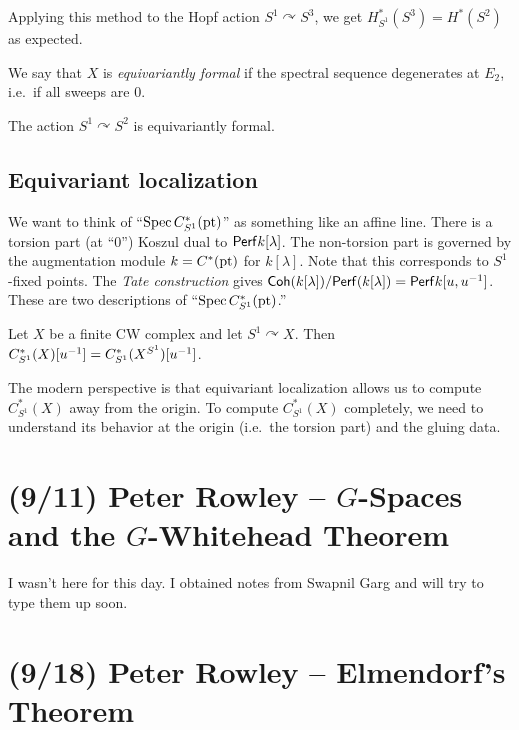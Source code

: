 \documentclass{article}
\begin{document}
\begin{ex}
  Applying this method to the Hopf action $S^1 \curvearrowright S^3$, we get $H^*_{S^1}(S^3) = H^*(S^2)$ as expected.
\end{ex}

We say that $X$ is \emph{equivariantly formal} if the spectral sequence degenerates at $E_2$, i.e.\ if all sweeps are $0$.

\begin{ex}
  The action $S^1 \curvearrowright S^2$ is equivariantly formal.
\end{ex}

\subsection{Equivariant localization}

We want to think of ``$\operatorname{Spec} C^*_{S^1}(\operatorname{pt})$'' as something like an affine line.
There is a torsion part (at ``$0$'') Koszul dual to $\mathsf{Perf} k[\lambda]$.
The non-torsion part is governed by the augmentation module $k = C^*(\operatorname{pt})$ for $k[\lambda]$.
Note that this corresponds to $S^1$-fixed points.
The \emph{Tate construction} gives $\mathsf{Coh}(k[\lambda]) / \mathsf{Perf}(k[\lambda]) = \mathsf{Perf} k[u, u^{-1}]$.
These are two descriptions of ``$\operatorname{Spec} C^*_{S^1}(\operatorname{pt})$.''

\begin{thm}
  Let $X$ be a finite CW complex and let $S^1 \curvearrowright X$.
  Then $C^*_{S^1}(X)[u^{-1}] = C^*_{S^1}(X^{S^1})[u^{-1}]$.
\end{thm}

The modern perspective is that equivariant localization allows us to compute $C^*_{S^1}(X)$ away from the origin.
To compute $C^*_{S^1}(X)$ completely, we need to understand its behavior at the origin (i.e.\ the torsion part) and the gluing data.

\section{(9/11) Peter Rowley -- $G$-Spaces and the $G$-Whitehead Theorem}

I wasn't here for this day.
I obtained notes from Swapnil Garg and will try to type them up soon.

\section{(9/18) Peter Rowley -- Elmendorf's Theorem}
\end{document}
